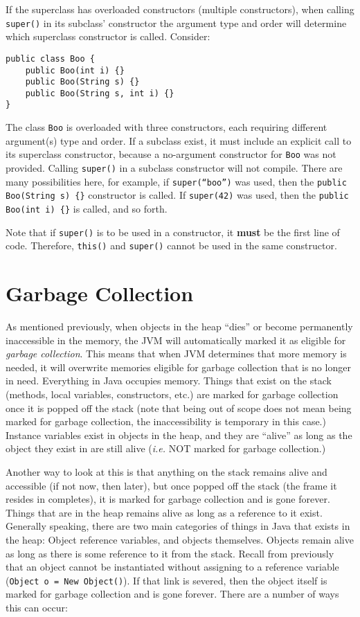 \documentclass{tufte-handout}
\begin{document}
    If the superclass has overloaded constructors (multiple constructors), when calling \texttt{super()} in its subclass' constructor the argument type and order will determine which superclass constructor is called. Consider:

    \begin{lstlisting}
public class Boo {
    public Boo(int i) {}
    public Boo(String s) {}
    public Boo(String s, int i) {}
}
    \end{lstlisting}

    The class \texttt{Boo} is overloaded with three constructors, each requiring different argument(s) type and order. If a subclass exist, it must include an explicit call to its superclass constructor, because a no-argument constructor for \texttt{Boo} was not provided. Calling \texttt{super()} in a subclass constructor will not compile. There are many possibilities here, for example, if \texttt{super(``boo'')} was used, then the \texttt{public Boo(String s) \{\}} constructor is called. If \texttt{super(42)} was used, then the \texttt{public Boo(int i) \{\}} is called, and so forth. 

    Note that if \texttt{super()} is to be used in a constructor, it \textbf{must} be the first line of code. Therefore, \texttt{this()} and \texttt{super()} cannot be used in the same constructor. 

    \section*{Garbage Collection}
    As mentioned previously, when objects in the heap ``dies'' or become permanently inaccessible in the memory, the JVM will automatically marked it as eligible for \emph{garbage collection}. This means that when JVM determines that more memory is needed, it will overwrite memories eligible for garbage collection that is no longer in need. Everything in Java occupies memory. Things that exist on the stack (methods, local variables, constructors, etc.) are marked for garbage collection once it is popped off the stack (note that being out of scope does not mean being marked for garbage collection, the inaccessibility is temporary in this case.) Instance variables exist in objects in the heap, and they are ``alive'' as long as the object they exist in are still alive (\textit{i.e.} NOT marked for garbage collection.) 

    Another way to look at this is that anything on the stack remains alive and accessible (if not now, then later), but once popped off the stack (the frame it resides in completes), it is marked for garbage collection and is gone forever. Things that are in the heap remains alive as long as a reference to it exist. Generally speaking, there are two main categories of things in Java that exists in the heap: Object reference variables, and objects themselves. Objects remain alive as long as there is some reference to it from the stack. Recall from previously that an object cannot be instantiated without assigning to a reference variable (\texttt{Object o = New Object()}). If that link is severed, then the object itself is marked for garbage collection and is gone forever. There are a number of ways this can occur:
\end{document}

